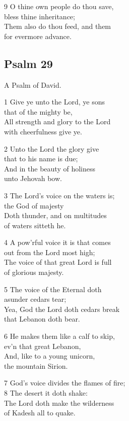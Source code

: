 9 O thine own people do thou save,\\
bless thine inheritance;\\
Them also do thou feed, and them\\
for evermore advance.

\begin{center}
\quad{}\quad{}
\end{center}

\subsection*{Psalm 29}

A Psalm of David.

1 Give ye unto the Lord, ye sons\\
that of the mighty be,\\
All strength and glory to the Lord\\
with cheerfulness give ye.

2 Unto the Lord the glory give\\
that to his name is due;\\
And in the beauty of holiness\\
unto Jehovah bow.

3 The Lord’s voice on the waters is;\\
the God of majesty\\
Doth thunder, and on multitudes\\
of waters sitteth he.

4 A pow’rful voice it is that comes\\
out from the Lord most high;\\
The voice of that great Lord is full\\
of glorious majesty.

5 The voice of the Eternal doth\\
asunder cedars tear;\\
Yea, God the Lord doth cedars break\\
that Lebanon doth bear.

6 He makes them like a calf to skip,\\
ev’n that great Lebanon,\\
And, like to a young unicorn,\\
the mountain Sirion.

7 God’s voice divides the flames of fire;\\
8 The desert it doth shake:\\
The Lord doth make the wilderness\\
of Kadesh all to quake.

